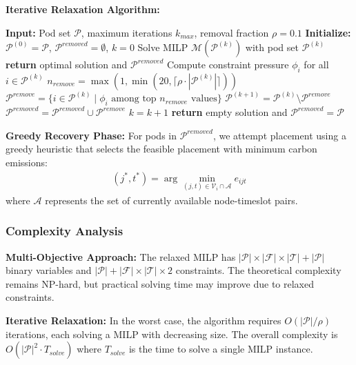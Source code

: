 \documentclass{article}
\begin{document}
\textbf{Iterative Relaxation Algorithm:}

\begin{algorithm}[H]
\caption{Iterative Constraint Relaxation}
\begin{algorithmic}[1]
\STATE \textbf{Input:} Pod set $\mathcal{P}$, maximum iterations $k_{max}$, removal fraction $\rho = 0.1$
\STATE \textbf{Initialize:} $\mathcal{P}^{(0)} = \mathcal{P}$, $\mathcal{P}^{removed} = \emptyset$, $k = 0$
    \STATE Solve MILP $\mathcal{M}(\mathcal{P}^{(k)})$ with pod set $\mathcal{P}^{(k)}$
        \STATE \textbf{return} optimal solution and $\mathcal{P}^{removed}$
    \ENDIF
    \STATE Compute constraint pressure $\phi_i$ for all $i \in \mathcal{P}^{(k)}$
    \STATE $n_{remove} = \max(1, \min(20, \lceil \rho \cdot |\mathcal{P}^{(k)}| \rceil))$
    \STATE $\mathcal{P}^{remove} = \{i \in \mathcal{P}^{(k)} \mid \phi_i \text{ among top } n_{remove} \text{ values}\}$
    \STATE $\mathcal{P}^{(k+1)} = \mathcal{P}^{(k)} \setminus \mathcal{P}^{remove}$
    \STATE $\mathcal{P}^{removed} = \mathcal{P}^{removed} \cup \mathcal{P}^{remove}$
    \STATE $k = k + 1$
\ENDWHILE
\STATE \textbf{return} empty solution and $\mathcal{P}^{removed} = \mathcal{P}$
\end{algorithmic}
\end{algorithm}

\textbf{Greedy Recovery Phase:}
For pods in $\mathcal{P}^{removed}$, we attempt placement using a greedy heuristic that selects the feasible placement with minimum carbon emissions:
\begin{align}
(j^*, t^*) = \arg\min_{(j,t) \in \mathcal{V}_i \cap \mathcal{A}} e_{ijt}
\end{align}
where $\mathcal{A}$ represents the set of currently available node-timeslot pairs.

\subsubsection{Complexity Analysis}

\textbf{Multi-Objective Approach:}
The relaxed MILP has $|\mathcal{P}| \times |\mathcal{F}| \times |\mathcal{T}| + |\mathcal{P}|$ binary variables and $|\mathcal{P}| + |\mathcal{F}| \times |\mathcal{T}| \times 2$ constraints. The theoretical complexity remains NP-hard, but practical solving time may improve due to relaxed constraints.

\textbf{Iterative Relaxation:}
In the worst case, the algorithm requires $O(|\mathcal{P}|/\rho)$ iterations, each solving a MILP with decreasing size. The overall complexity is $O(|\mathcal{P}|^2 \cdot T_{solve})$ where $T_{solve}$ is the time to solve a single MILP instance.
\end{document}
